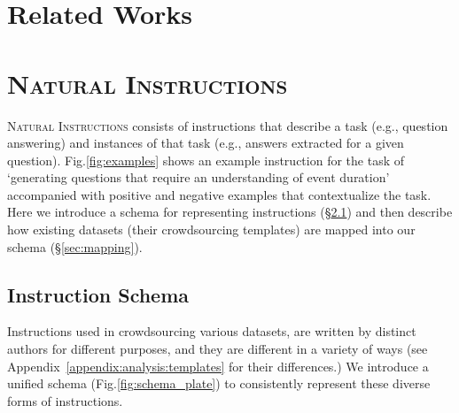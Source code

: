 \section{Related Works}
\label{sec:related:work}

\section{\textsc{Natural Instructions}}
\label{sec:construction:natural:instructions}

\textsc{Natural Instructions} consists of instructions that describe a task (e.g., question answering) and instances of that task (e.g., answers extracted for a given question). 
Fig.\ref{fig:examples} shows  an example instruction for the task of `generating questions that require an understanding of event duration' accompanied with positive and negative examples that contextualize the task. Here we introduce a schema for representing instructions  (\S\ref{subsec:schema}) and then describe how existing datasets (their crowdsourcing templates) are mapped into  our schema  (\S\ref{sec:mapping}). 

\subsection{Instruction Schema}
\label{subsec:schema}

Instructions used in crowdsourcing various datasets, are written by distinct authors for different purposes, and  they are different in a variety of ways (see  Appendix~\ref{appendix:analysis:templates} for their differences.) We introduce a unified schema (Fig.\ref{fig:schema_plate}) to consistently represent these diverse forms of instructions. 

